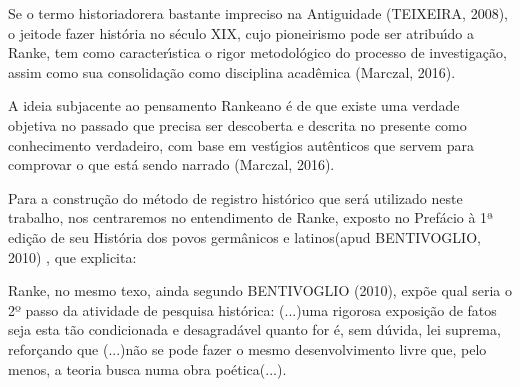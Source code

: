 \documentclass[
12pt,		%
openright,	%
twoside,  %
a4paper,			%
chapter=TITLE,		%
english,			%
french,				%
spanish,			%
brazil				%
]{USPSC-classe/USPSC_RedarTex}
\begin{document}
Se o termo \textquotedbl historiador\textquotedbl  era bastante impreciso na Antiguidade (TEIXEIRA, 2008), o \textquotedbl jeito\textquotedbl  de fazer hist\'oria no s\'eculo XIX, cujo pioneirismo pode ser atribu\'{\i}do a Ranke, tem como caracter\'{\i}stica \textquotedbl o rigor metodol\'ogico do processo de investiga\c{c}\~ao\textquotedbl , assim como sua consolida\c{c}\~ao como disciplina acad\^emica (Marczal, 2016).








A ideia subjacente ao pensamento Rankeano \'e de que existe uma verdade objetiva no passado que precisa ser descoberta e descrita no presente como \textquotedbl conhecimento verdadeiro\textquotedbl , com base em vest\'{\i}gios aut\^enticos que servem para comprovar o que est\'a sendo narrado (Marczal, 2016).








Para a constru\c{c}\~ao do m\'etodo de registro hist\'orico que ser\'a utilizado neste trabalho, nos centraremos no entendimento de Ranke, exposto no Pref\'acio \`a 1ª edi\c{c}\~ao de seu \textquotedbl Hist\'oria dos povos germ\^anicos e latinos\textquotedbl   (apud BENTIVOGLIO, 2010) , que explicita:









\noindent\begin{center}\mbox{\centering{}}\end{center}


Ranke, no mesmo texo, ainda segundo  BENTIVOGLIO (2010), exp\~oe qual seria o 2º passo da atividade de pesquisa hist\'orica: \textquotedbl (...)uma rigorosa exposi\c{c}\~ao de fatos seja esta t\~ao condicionada e desagrad\'avel quanto for \'e, sem d\'uvida, lei suprema\textquotedbl , refor\c{c}ando que \textquotedbl (...)n\~ao se pode fazer o mesmo desenvolvimento livre que, pelo menos, a teoria busca numa obra po\'etica(...)\textquotedbl .
\end{document}
